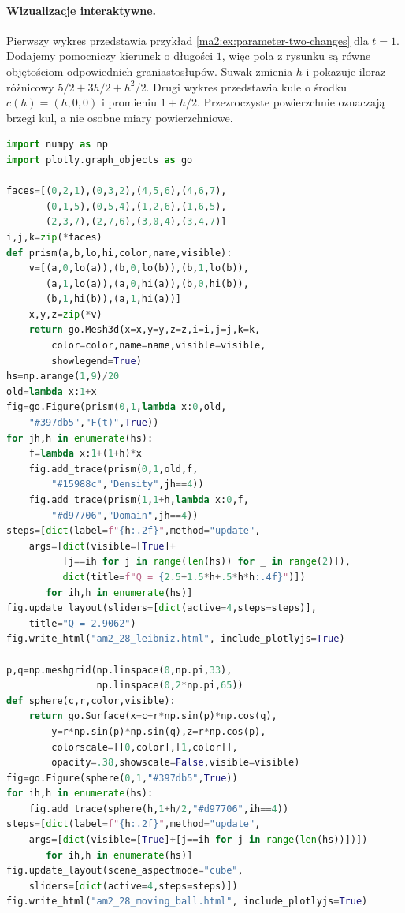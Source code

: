 \paragraph{Wizualizacje interaktywne.}
Pierwszy wykres przedstawia przykład
\ref{ma2:ex:parameter-two-changes} dla $t=1$.
Dodajemy pomocniczy kierunek o długości $1$,
więc pola z rysunku są równe objętościom
odpowiednich graniastosłupów.
Suwak zmienia $h$ i pokazuje iloraz
różnicowy $5/2+3h/2+h^2/2$.
Drugi wykres przedstawia kule o środku
$c(h)=(h,0,0)$ i promieniu $1+h/2$.
Przezroczyste powierzchnie oznaczają
brzegi kul, a nie osobne miary powierzchniowe.
\begin{lstlisting}[language=Python]
import numpy as np
import plotly.graph_objects as go

faces=[(0,2,1),(0,3,2),(4,5,6),(4,6,7),
       (0,1,5),(0,5,4),(1,2,6),(1,6,5),
       (2,3,7),(2,7,6),(3,0,4),(3,4,7)]
i,j,k=zip(*faces)
def prism(a,b,lo,hi,color,name,visible):
    v=[(a,0,lo(a)),(b,0,lo(b)),(b,1,lo(b)),
       (a,1,lo(a)),(a,0,hi(a)),(b,0,hi(b)),
       (b,1,hi(b)),(a,1,hi(a))]
    x,y,z=zip(*v)
    return go.Mesh3d(x=x,y=y,z=z,i=i,j=j,k=k,
        color=color,name=name,visible=visible,
        showlegend=True)
hs=np.arange(1,9)/20
old=lambda x:1+x
fig=go.Figure(prism(0,1,lambda x:0,old,
    "#397db5","F(t)",True))
for jh,h in enumerate(hs):
    f=lambda x:1+(1+h)*x
    fig.add_trace(prism(0,1,old,f,
        "#15988c","Density",jh==4))
    fig.add_trace(prism(1,1+h,lambda x:0,f,
        "#d97706","Domain",jh==4))
steps=[dict(label=f"{h:.2f}",method="update",
    args=[dict(visible=[True]+
          [j==ih for j in range(len(hs)) for _ in range(2)]),
          dict(title=f"Q = {2.5+1.5*h+.5*h*h:.4f}")])
       for ih,h in enumerate(hs)]
fig.update_layout(sliders=[dict(active=4,steps=steps)],
    title="Q = 2.9062")
fig.write_html("am2_28_leibniz.html", include_plotlyjs=True)

p,q=np.meshgrid(np.linspace(0,np.pi,33),
                np.linspace(0,2*np.pi,65))
def sphere(c,r,color,visible):
    return go.Surface(x=c+r*np.sin(p)*np.cos(q),
        y=r*np.sin(p)*np.sin(q),z=r*np.cos(p),
        colorscale=[[0,color],[1,color]],
        opacity=.38,showscale=False,visible=visible)
fig=go.Figure(sphere(0,1,"#397db5",True))
for ih,h in enumerate(hs):
    fig.add_trace(sphere(h,1+h/2,"#d97706",ih==4))
steps=[dict(label=f"{h:.2f}",method="update",
    args=[dict(visible=[True]+[j==ih for j in range(len(hs))])])
       for ih,h in enumerate(hs)]
fig.update_layout(scene_aspectmode="cube",
    sliders=[dict(active=4,steps=steps)])
fig.write_html("am2_28_moving_ball.html", include_plotlyjs=True)
\end{lstlisting}

